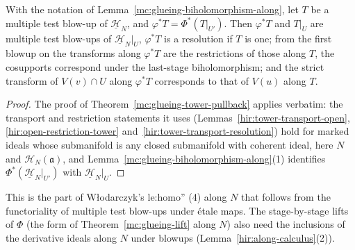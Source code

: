 \begin{theorem}
\label{mc:glueing-tower-pullback-along}
\leanok
With the notation of Lemma~\ref{mc:glueing-biholomorphism-along}, let \(T\) be a multiple test blow-up of \(\underline{\mathcal H}_N\), and \(\varphi^*T=\Phi^*(T|_{U'})\). Then
\(\varphi^*T\) and \(T|_U\) are multiple test blow-ups of \(\underline{\mathcal H}_N|_U\), \(\varphi^*T\) is a resolution if \(T\) is one; from the first blowup on the transforms
along \(\varphi^*T\) are the restrictions of those along \(T\), the cosupports correspond under the last-stage biholomorphism; and the strict transform of
\(V(v)\cap U\) along \(\varphi^*T\) corresponds to that of \(V(u)\) along \(T\).
\end{theorem}
\begin{proof}
\leanok
The proof of Theorem~\ref{mc:glueing-tower-pullback} applies verbatim: the transport and restriction statements it uses
(Lemmas~\ref{hir:tower-transport-open}, \ref{hir:open-restriction-tower} and~\ref{hir:tower-transport-resolution}) hold for marked ideals whose submanifold is any closed
submanifold with coherent ideal, here \(N\) and \(\mathcal H_N(\mathfrak a)\), and Lemma~\ref{mc:glueing-biholomorphism-along}(1) identifies \(\Phi^*(\underline{\mathcal H}_N|_{U'})\) with
\(\underline{\mathcal H}_N|_U\).
\end{proof}
This is the part of Włodarczyk's le:homo'' (4) along \(N\) that follows from the functoriality of multiple test blow-ups under étale maps. The stage-by-stage
lifts of \(\Phi\) (the form of Theorem~\ref{mc:glueing-lift} along \(N\)) also need the inclusions of the derivative ideals along \(N\) under blowups
(Lemma~\ref{hir:along-calculus}(2)).

